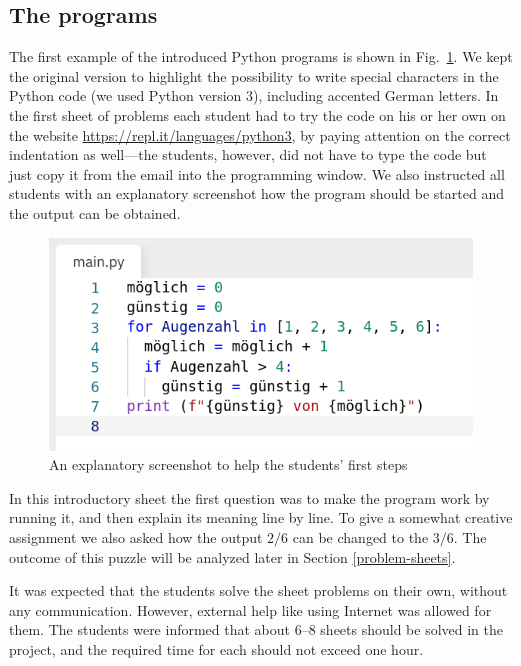 \documentclass[]{interact}
\theoremstyle{plain}%
\theoremstyle{definition}
\theoremstyle{remark}
\begin{document}
\subsection{The programs}

The first example of the introduced Python programs
is shown in Fig.~\ref{main-py-window}. We kept the original version to highlight
the possibility to write special characters in the Python code (we used Python version 3),
including accented German letters. In the first sheet of problems each student had to try
the code on his or her own on the website \url{https://repl.it/languages/python3},
by paying attention on the correct indentation as well---the students, however, did not have
to type the code but just copy it from the email into the programming window.
We also instructed all students with an
explanatory screenshot how the program should be started and the output can be obtained.

\begin{figure}
\begin{center}\includegraphics[scale=0.4]{../forms/de_AT/main-py-window}
\caption{An explanatory screenshot to help the students' first steps}
\label{main-py-window}
\end{center}
\end{figure}

In this introductory sheet the first question was to make the program work by running it,
and then explain its meaning line by line.
To give a somewhat creative assignment we also asked how the output $2/6$ can be changed to
the $3/6$. The outcome of this puzzle will be analyzed later in Section \ref{problem-sheets}.

It was expected that the students solve the sheet problems on their own, without
any communication. However, external help like using Internet was allowed for them.
The students were informed that about 6--8 sheets should be solved in the project,
and the required time for each should not exceed one hour.
\end{document}
